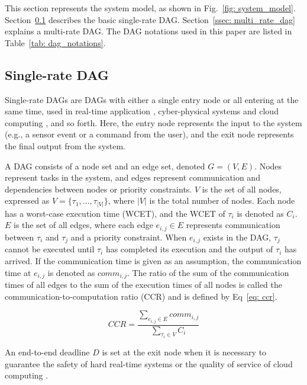This section represents the system model, as shown in Fig.~\ref{fig: system_model}.
Section~\ref{ssec: single_rate_dag} describes the basic single-rate DAG.
Section~\ref{ssec: multi_rate_dag} explains a multi-rate DAG.
The DAG notations used in this paper are listed in Table~\ref{tab: dag_notations}.


\subsection{Single-rate DAG}
\label{ssec: single_rate_dag}

Single-rate DAGs are DAGs with either a single entry node or all entering at the same time, used in real-time application \cite{zhao2020dag}, cyber-physical systems \cite{senapati2021hmds} and cloud computing \cite{kaur2020deep}, and so forth.
Here, the entry node represents the input to the system (e.g., a sensor event or a command from the user), and the exit node represents the final output from the system.

A DAG consists of a node set and an edge set, denoted $G = (V, E)$.
Nodes represent tasks in the system, and edges represent communication and dependencies between nodes or priority constraints.
$V$ is the set of all nodes, expressed as $V = \{\tau_1, ..., \tau_{|V|}\}$, where $|V|$ is the total number of nodes.
Each node has a worst-case execution time (WCET), and the WCET of $\tau_i$ is denoted as $C_i$.
$E$ is the set of all edges, where each edge $e_{i,j} \in E$ represents communication between $\tau_i$ and $\tau_j$ and a priority constraint.
When $e_{i,j}$ exists in the DAG, $\tau_j$ cannot be executed until $\tau_i$ has completed its execution and the output of $\tau_i$ has arrived.
If the communication time is given as an assumption, the communication time at $e_{i,j}$ is denoted as $comm_{i, j}$.
The ratio of the sum of the communication times of all edges to the sum of the execution times of all nodes is called the communication-to-computation ratio (CCR) and is defined by Eq~\ref{eq: ccr}.

\begin{equation}
    \label{eq: ccr}
    CCR = \frac{\sum\limits_{e_{i,j} \in E}comm_{i, j}}{\sum\limits_{\tau_i \in V}C_i}
\end{equation}

An end-to-end deadline $D$ is set at the exit node when it is necessary to guarantee the safety of hard real-time systems \cite{yano2021work} or the quality of service of cloud computing \cite{zhang2020efficient}.



